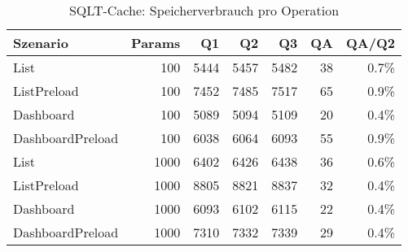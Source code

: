 \begin{table}[ht]
\centering
\caption{SQLT-Cache: Speicherverbrauch pro Operation}
\begin{tabular}{lrrrrrr}
\toprule
Szenario & Params & Q1 & Q2 & Q3 & QA & QA/Q2 \\
\midrule
		List & 100 & 5444 & 5457 & 5482 & 38 & 0.7\% \\
		ListPreload & 100 & 7452 & 7485 & 7517 & 65 & 0.9\% \\
		Dashboard & 100 & 5089 & 5094 & 5109 & 20 & 0.4\% \\
		DashboardPreload & 100 & 6038 & 6064 & 6093 & 55 & 0.9\% \\
		List & 1000 & 6402 & 6426 & 6438 & 36 & 0.6\% \\
		ListPreload & 1000 & 8805 & 8821 & 8837 & 32 & 0.4\% \\
		Dashboard & 1000 & 6093 & 6102 & 6115 & 22 & 0.4\% \\
		DashboardPreload & 1000 & 7310 & 7332 & 7339 & 29 & 0.4\% \\
\bottomrule
\end{tabular}
\label{tab:benchmark_sqlt-cache_bytesperop}
\end{table}
	